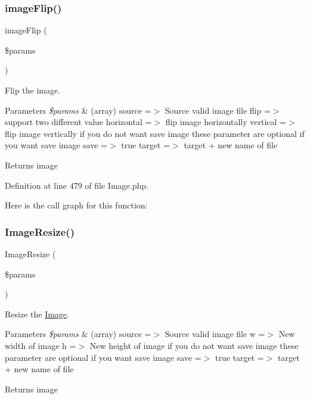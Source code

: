 \subsubsection{\texorpdfstring{image\+Flip()}{imageFlip()}}
{\footnotesize\ttfamily image\+Flip (\begin{DoxyParamCaption}\item[{}]{\$params }\end{DoxyParamCaption})}

Flip the image.


\begin{DoxyParams}{Parameters}
{\em \$params} & (array) \textquotesingle{}source\textquotesingle{} =$>$ Source valid image file \textquotesingle{}flip\textquotesingle{} =$>$ support two different value \textquotesingle{}horizontal\textquotesingle{} =$>$ flip image horizontally \textquotesingle{}vertical\textquotesingle{} =$>$ flip image vertically if you do not want save image these parameter are optional if you want save image \textquotesingle{}save\textquotesingle{} =$>$ true \textquotesingle{}target\textquotesingle{} =$>$ target + new name of file\\
\hline
\end{DoxyParams}
\begin{DoxyReturn}{Returns}
image 
\end{DoxyReturn}


Definition at line 479 of file Image.\+php.

Here is the call graph for this function\+:
\mbox{\label{class_zest_1_1_image_1_1_image_ad35abb3d08e6a33f1634bed36d90b3b6}} 
\subsubsection{\texorpdfstring{Image\+Resize()}{ImageResize()}}
{\footnotesize\ttfamily Image\+Resize (\begin{DoxyParamCaption}\item[{}]{\$params }\end{DoxyParamCaption})}

Resize the \mbox{\hyperlink{class_zest_1_1_image_1_1_image}{Image}}.


\begin{DoxyParams}{Parameters}
{\em \$params} & (array) \textquotesingle{}source\textquotesingle{} =$>$ Source valid image file \textquotesingle{}w\textquotesingle{} =$>$ New width of image \textquotesingle{}h\textquotesingle{} =$>$ New height of image if you do not want save image these parameter are optional if you want save image \textquotesingle{}save\textquotesingle{} =$>$ true \textquotesingle{}target\textquotesingle{} =$>$ target + new name of file\\
\hline
\end{DoxyParams}
\begin{DoxyReturn}{Returns}
image 
\end{DoxyReturn}


